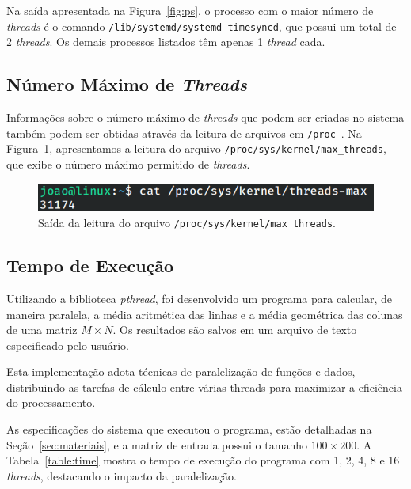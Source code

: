 \documentclass[
	12pt,				%
	oneside,   	        %
	a4paper,			%
	english,			%
	french,				%
	spanish,			%
	brazil,				%
	]{pacotes/abntex2}
\begin{document}
Na saída apresentada na Figura~\ref{fig:ps}, o processo com o maior número de \textit{threads} é o comando \texttt{/lib/systemd/systemd-timesyncd}, que possui um total de 2 \textit{threads}. Os demais processos listados têm apenas 1 \textit{thread} cada.

\subsection{Número Máximo de \textit{Threads}}
\label{subsec:max_threads}

Informações sobre o número máximo de \textit{threads} que podem ser criadas no sistema também podem ser obtidas através da leitura de arquivos em \texttt{/proc}~\cite{negus2012}. Na Figura~\ref{fig:max_threads}, apresentamos a leitura do arquivo \texttt{/proc/sys/kernel/max\_threads}, que exibe o número máximo permitido de \textit{threads}.

\begin{figure}[H]
  \centering
  \includegraphics[scale=0.45]{figuras/max_threads.png}
  \caption{Saída da leitura do arquivo \texttt{/proc/sys/kernel/max\_threads}.}
  \label{fig:max_threads}
\end{figure}

\subsection{Tempo de Execução}
\label{subsec:time}

Utilizando a biblioteca \textit{pthread}, foi desenvolvido um programa para calcular, de maneira paralela, a média aritmética das linhas e a média geométrica das colunas de uma matriz $M \times N$. Os resultados são salvos em um arquivo de texto especificado pelo usuário.

Esta implementação adota técnicas de paralelização de funções e dados, distribuindo as tarefas de cálculo entre várias threads para maximizar a eficiência do processamento.

As especificações do sistema que executou o programa, estão detalhadas na Seção~\ref{sec:materiais}, e a matriz de entrada possui o tamanho $100 \times 200$. A Tabela~\ref{table:time} mostra o tempo de execução do programa com 1, 2, 4, 8 e 16 \textit{threads}, destacando o impacto da paralelização.
\end{document}
